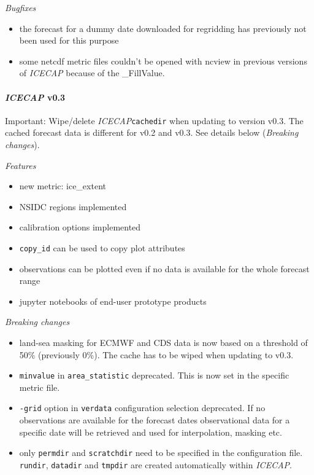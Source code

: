 \documentclass[DIV=10, parskip=full]{scrreprt}
\newcommand{\ice}{\textit{ICECAP}\xspace}
\begin{document}
\textit{Bugfixes}
\begin{itemize}
	\item the forecast for a dummy date downloaded for regridding has previously not been used for this purpose
	\item some netcdf metric files couldn't be opened with ncview in previous versions of \ice because of the \_FillValue. 
\end{itemize}

\paragraph{\textbf{\ice v0.3\\[5pt]}}

Important: Wipe/delete \ice \texttt{cachedir} when updating to version v0.3. The cached forecast data is different for v0.2 and v0.3. See details below (\textit{Breaking changes}).

\textit{Features}
\begin{itemize}
	\item new metric: ice\_extent
	\item NSIDC regions implemented
	\item calibration options implemented
	\item \texttt{copy\_id} can be used to copy plot attributes
	\item observations can be plotted even if no data is available for the whole forecast range
	\item jupyter notebooks of end-user prototype products
\end{itemize}

\textit{Breaking changes}
\begin{itemize}
	\item land-sea masking for ECMWF and CDS data is now based on a threshold of 50\% (previously 0\%). The cache has to be wiped when updating to v0.3.
	\item \texttt{minvalue} in \texttt{area\_statistic} deprecated. This is now set in the specific metric file. 
	\item \texttt{-grid} option in \texttt{verdata} configuration selection deprecated. If no observations are available for the forecast dates observational data for a specific date will be retrieved and used for interpolation, masking etc. 
	\item only \texttt{permdir} and \texttt{scratchdir} need to be specified in the configuration file. \texttt{rundir}, \texttt{datadir} and \texttt{tmpdir} are created automatically within \ice.
\end{itemize}
\end{document}
